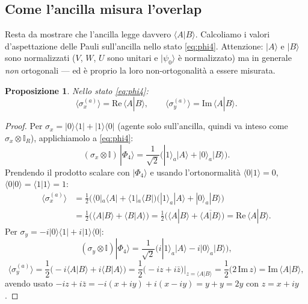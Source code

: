 \documentclass[11pt,a4paper]{article}
\newtheorem{proposizione}{Proposizione}
\begin{document}
\subsection{Come l'ancilla misura l'overlap}

Resta da mostrare che l'ancilla legge davvero $\langle A|B\rangle$. Calcoliamo i valori
d'aspettazione delle Pauli sull'ancilla nello stato \eqref{eq:phi4}. Attenzione: $|A\rangle$ e
$|B\rangle$ sono normalizzati ($V$, $W$, $U$ sono unitari e $|\psi_0\rangle$ è normalizzato) ma
in generale \emph{non} ortogonali --- ed è proprio la loro non-ortogonalità a essere misurata.

\begin{proposizione}
Nello stato \eqref{eq:phi4}:
\begin{equation}
\langle\sigma_x^{(a)}\rangle=\mathrm{Re}\,\langle A|B\rangle,
\qquad
\langle\sigma_y^{(a)}\rangle=\mathrm{Im}\,\langle A|B\rangle .
\end{equation}
\end{proposizione}

\begin{proof}
Per $\sigma_x=|0\rangle\langle1|+|1\rangle\langle0|$ (agente solo sull'ancilla, quindi va inteso
come $\sigma_x\otimes\mathbb I_R$), applichiamolo a \eqref{eq:phi4}:
\begin{equation}
(\sigma_x\otimes\mathbb I)\,|\Phi_4\rangle=\frac{1}{\sqrt2}\Big(|1\rangle_a|A\rangle+|0\rangle_a|B\rangle\Big).
\end{equation}
Prendendo il prodotto scalare con $|\Phi_4\rangle$ e usando l'ortonormalità
$\langle0|1\rangle=0$, $\langle0|0\rangle=\langle1|1\rangle=1$:
\begin{align}
\langle\sigma_x^{(a)}\rangle
&=\frac{1}{2}\Big(\langle0|_a\langle A|+\langle1|_a\langle B|\Big)\Big(|1\rangle_a|A\rangle+|0\rangle_a|B\rangle\Big)\\
&=\frac{1}{2}\Big(\langle A|B\rangle+\langle B|A\rangle\Big)
=\frac{1}{2}\Big(\langle A|B\rangle+\overline{\langle A|B\rangle}\Big)
=\mathrm{Re}\,\langle A|B\rangle .
\end{align}
Per $\sigma_y=-i|0\rangle\langle1|+i|1\rangle\langle0|$:
\begin{equation}
(\sigma_y\otimes\mathbb I)|\Phi_4\rangle=\frac{1}{\sqrt2}\Big(i|1\rangle_a|A\rangle-i|0\rangle_a|B\rangle\Big),
\end{equation}
\begin{equation}
\langle\sigma_y^{(a)}\rangle=\frac{1}{2}\Big(-i\langle A|B\rangle+i\langle B|A\rangle\Big)
=\frac{1}{2}\Big(-i z+i\bar z\Big)\Big|_{z=\langle A|B\rangle}
=\frac{1}{2}\big(2\,\mathrm{Im}\,z\big)=\mathrm{Im}\,\langle A|B\rangle,
\end{equation}
avendo usato $-iz+i\bar z=-i(x+iy)+i(x-iy)=y+y=2y$ con $z=x+iy$.
\end{proof}
\end{document}
